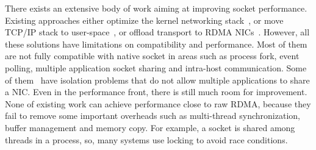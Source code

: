 There exists an extensive body of work aiming at improving socket performance.
Existing approaches either optimize the kernel networking stack~\cite{lin2016scalable,han2012megapipe,yasukata2016stackmap}, or move TCP/IP stack to user-space~\cite{jeong2014mtcp,marinos2014network,seastar,fstack,libvma}, or offload transport to RDMA NICs~\cite{rsockets,socketsdirect}.
However, all these solutions have limitations on compatibility and performance.
Most of them are not fully compatible with native socket in areas such as process fork, event polling, multiple application socket sharing and intra-host communication.
Some of them~\cite{jeong2014mtcp} have isolation problems that do not allow multiple applications to share a NIC.
Even in the performance front, there is still much room for improvement. None of existing work can achieve performance close to raw RDMA, because they fail to remove some important overheads such as multi-thread synchronization, buffer management and memory copy.
For example, a socket is shared among threads in a process, so, many systems use locking to avoid race conditions.


